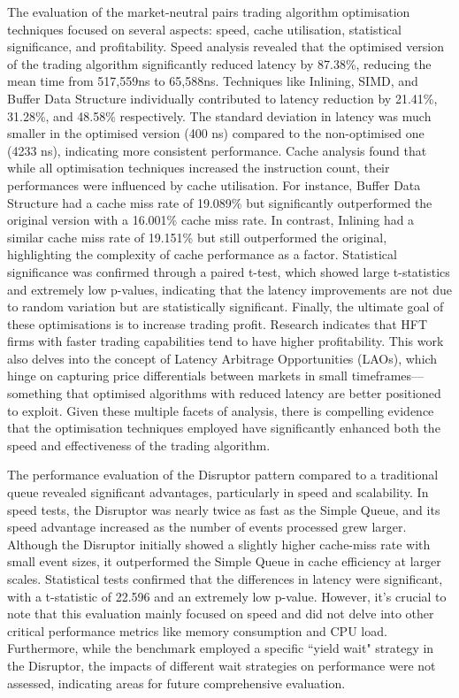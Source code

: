 \documentclass{article}
\theoremstyle{break}
\begin{document}
The evaluation of the market-neutral pairs trading algorithm optimisation techniques focused on several aspects: speed, cache utilisation, statistical significance, and profitability. Speed analysis revealed that the optimised version of the trading algorithm significantly reduced latency by 87.38\%, reducing the mean time from 517,559ns to 65,588ns. Techniques like Inlining, SIMD, and Buffer Data Structure individually contributed to latency reduction by 21.41\%, 31.28\%, and 48.58\% respectively. The standard deviation in latency was much smaller in the optimised version (400 ns) compared to the non-optimised one (4233 ns), indicating more consistent performance. Cache analysis found that while all optimisation techniques increased the instruction count, their performances were influenced by cache utilisation. For instance, Buffer Data Structure had a cache miss rate of 19.089\% but significantly outperformed the original version with a 16.001\% cache miss rate. In contrast, Inlining had a similar cache miss rate of 19.151\% but still outperformed the original, highlighting the complexity of cache performance as a factor. Statistical significance was confirmed through a paired t-test, which showed large t-statistics and extremely low p-values, indicating that the latency improvements are not due to random variation but are statistically significant. Finally, the ultimate goal of these optimisations is to increase trading profit. Research indicates that HFT firms with faster trading capabilities tend to have higher profitability. This work also delves into the concept of Latency Arbitrage Opportunities (LAOs), which hinge on capturing price differentials between markets in small timeframes—something that optimised algorithms with reduced latency are better positioned to exploit. Given these multiple facets of analysis, there is compelling evidence that the optimisation techniques employed have significantly enhanced both the speed and effectiveness of the trading algorithm.

The performance evaluation of the Disruptor pattern compared to a traditional queue revealed significant advantages, particularly in speed and scalability. In speed tests, the Disruptor was nearly twice as fast as the Simple Queue, and its speed advantage increased as the number of events processed grew larger. Although the Disruptor initially showed a slightly higher cache-miss rate with small event sizes, it outperformed the Simple Queue in cache efficiency at larger scales. Statistical tests confirmed that the differences in latency were significant, with a t-statistic of 22.596 and an extremely low p-value. However, it's crucial to note that this evaluation mainly focused on speed and did not delve into other critical performance metrics like memory consumption and CPU load. Furthermore, while the benchmark employed a specific ``yield wait" strategy in the Disruptor, the impacts of different wait strategies on performance were not assessed, indicating areas for future comprehensive evaluation.
\end{document}
